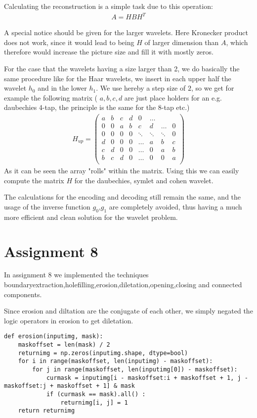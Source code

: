 Calculating the reconstruction is a simple task due to this operation:
\begin{gather*}
A = H B H^T
\end{gather*}

A special notice should be given for the larger wavelets. Here Kronecker product does not work, since it would lead to being $H$ of larger dimension than $A$, which therefore would increase the picture size and fill it with mostly zeros.

For the case that the wavelets having a size larger than 2, we do basically the same procedure like for the Haar wavelets, we insert in each upper half the wavelet $h_0$ and in the lower $h_1$. We use hereby a step size of $2$, so we get for example the following matrix ( $a,b,c,d$ are just place holders for an e.g. daubechies 4-tap, the principle is the same for the 8-tap etc.)
\begin{gather*}
H_{up} = \left( \begin{array}{cccccccc}
a & b & c & d & 0 & \hdots  \\
0 & 0 & a & b & c & d & \hdots & 0\\
0 & 0 & 0 & 0 & \ddots & \ddots & \ddots & 0\\
d & 0 & 0 & 0 & \ldots & a & b & c \\
c & d & 0 & 0 & \ldots & 0 & a & b \\
b & c & d & 0 & \ldots & 0 & 0 & a \\
\end{array}
\right) 
\end{gather*}
As it can be seen the array "rolls" within the matrix. Using this we can easily compute the matrix $H$ for the daubechies, symlet and cohen wavelet.

The calculations for the encoding and decoding still remain the same, and the usage of the inverse function $g_0$,$g_1$ are completely avoided, thus having a much more efficient and clean solution for the wavelet problem.

\section{Assignment 8}

In assignment 8 we implemented the techniques boundaryextraction,holefilling,erosion,diletation,opening,closing and connected components.

Since erosion and diltation are the conjugate of each other, we simply negated the logic operators in erosion to get diletation.
\begin{verbatim}
def erosion(inputimg, mask):
    maskoffset = len(mask) / 2
    returnimg = np.zeros(inputimg.shape, dtype=bool)
    for i in range(maskoffset, len(inputimg) - maskoffset):
        for j in range(maskoffset, len(inputimg[0]) - maskoffset):
            curmask = inputimg[i - maskoffset:i + maskoffset + 1, j - maskoffset:j + maskoffset + 1] & mask
            if (curmask == mask).all() :
                returnimg[i, j] = 1
    return returnimg               
\end{verbatim}

